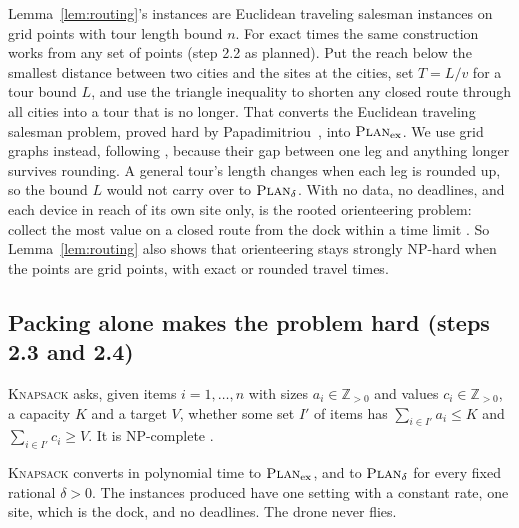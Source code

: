 \begin{remark}
\label{rem:tsp}
Lemma~\ref{lem:routing}'s instances are Euclidean traveling salesman
instances on grid points with tour length bound $n$. For exact times the
same construction works from any set of points (step 2.2 as planned). Put
the reach below the smallest distance between two cities and the sites at
the cities, set $T=L/v$ for a tour bound $L$, and use the triangle
inequality to shorten any closed route through all cities into a tour that
is no longer. That converts the Euclidean traveling salesman problem,
proved hard by Papadimitriou~\cite{Papadimitriou1977}, into
$\textsc{Plan}_{\mathrm{ex}}$. We use grid graphs instead, following
\cite{ItaiPapadimitriouSzwarcfiter1982}, because their gap between one leg
and anything longer survives rounding. A general tour's length changes when
each leg is rounded up, so the bound $L$ would not carry over to
$\textsc{Plan}_\delta$. With no data, no deadlines, and each device in reach of its
own site only, \PLAN{} is the rooted orienteering problem: collect the most
value on a closed route from the dock within a time limit
\cite{GoldenLevyVohra1987,Vansteenwegen2011}. So Lemma~\ref{lem:routing}
also shows that orienteering stays strongly NP-hard when the points are grid
points, with exact or rounded travel times.
\end{remark}

\subsection{Packing alone makes the problem hard (steps 2.3 and 2.4)}
\label{sec:t1-packing}

\textsc{Knapsack} asks, given items $i=1,\dots,n$ with sizes $a_i\in\mathbb{Z}_{>0}$
and values $c_i\in\mathbb{Z}_{>0}$, a capacity $K$ and a target $V$,
whether some set $I'$ of items has $\sum_{i\in I'}a_i\le K$ and
$\sum_{i\in I'}c_i\ge V$. It is NP-complete \cite[problem MP9]{GareyJohnson1979}.

\begin{lemma}[Packing]
\label{lem:packing}
\textsc{Knapsack} converts in polynomial time to $\textsc{Plan}_{\mathrm{ex}}$, and
to $\textsc{Plan}_\delta$ for every fixed rational $\delta>0$. The instances
produced have one setting with a constant rate, one site, which is the
dock, and no deadlines. The drone never flies.
\end{lemma}

